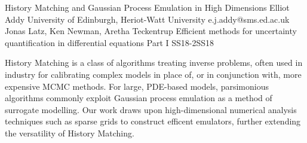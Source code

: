 \begin{talk}
  {History Matching and Gaussian Process Emulation in High Dimensions}%
  {Elliot Addy}%
  {University of Edinburgh, Heriot-Watt University}%
  {e.j.addy@sms.ed.ac.uk}%
  {Jonas Latz, Ken Newman, Aretha Teckentrup}%
{Efficient methods for uncertainty quantification in differential equations Part I}
{}{SS18-2}{SS18}

			
History Matching is a class of algorithms treating inverse problems, often used in industry for calibrating complex models in place of, or in conjunction with, more expensive MCMC methods. For large, PDE-based models, parsimonious algorithms commonly exploit Gaussian process emulation as a method of surrogate modelling. Our work draws upon high-dimensional numerical analysis techniques such as sparse grids to construct efficent emulators, further extending the versatility of History Matching.


\end{talk}

